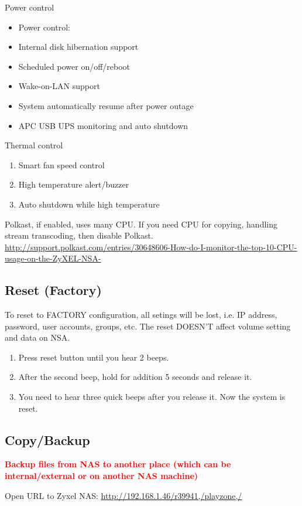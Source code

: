 Power control
\begin{itemize}
\item Power control:
\item  Internal disk hibernation support
\item  Scheduled power on/off/reboot
\item  Wake-on-LAN support
\item  System automatically resume after power outage
\item  APC USB UPS monitoring and auto shutdown
\end{itemize}

Thermal control
\begin{enumerate}
  \item Smart fan speed control
\item  High temperature alert/buzzer
\item  Auto shutdown while high temperature
\end{enumerate}

Polkast, if enabled, uses many CPU. If you need CPU for copying, handling stream
transcoding, then disable Polkast.
\url{http://support.polkast.com/entries/30648606-How-do-I-monitor-the-top-10-CPU-usage-on-the-ZyXEL-NSA-}


\subsection{Reset (Factory)}

To reset to FACTORY configuration, all setings will be lost, i.e.  IP address,
password, user accounts, groups, etc. The reset DOESN'T affect volume setting
and data on NSA.
\begin{enumerate}
  \item Press reset button until you hear 2 beeps.
  \item After the second beep, hold for addition 5 seconds and release it.
  \item You need to hear three quick beeps after you release it. Now the system
  is reset.
\end{enumerate}

\subsection{Copy/Backup}

\textcolor{red}{\bf Backup files from NAS to another place (which can be
internal/external or on another NAS machine)} 

Open URL to Zyxel NAS:
\url{http://192.168.1.46/r39941,/playzone,/}

